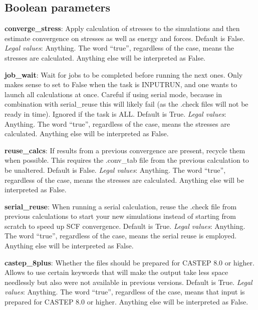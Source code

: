 \documentclass[10pt]{article}
\begin{document}
\subsection{Boolean parameters}

\textbf{converge\_stress}: Apply calculation of stresses to the simulations and 
then estimate convergence on stresses as well as energy and forces. Default is 
False.\newline
\textit{Legal values}: Anything. The word ``true'', regardless of the case, 
means the stresses are calculated. Anything else will be interpreted as 
False.\newline

\textbf{job\_wait}: Wait for jobs to be completed before running the next ones.
Only makes sense to set to False when the task is INPUTRUN, and one wants to 
launch all calculations at once. Careful if using serial mode, because in 
combination with serial\_reuse this will likely fail (as the .check files will
not be ready in time). Ignored if the task is ALL. Default is True.\newline
\textit{Legal values}: Anything. The word ``true'', regardless of the case, 
means the stresses are calculated. Anything else will be interpreted as 
False.\newline

\textbf{reuse\_calcs}: If results from a previous convergence are present, 
recycle them when possible. This requires the .conv\_tab file from the previous 
calculation to be unaltered. Default is False.\newline
\textit{Legal values}: Anything. The word ``true'', regardless of the case, 
means the stresses are calculated. Anything else will be interpreted as 
False.\newline

\textbf{serial\_reuse}: When running a serial calculation, reuse the .check file from previous calculations to start your new simulations instead of starting from scratch to speed up SCF convergence. Default is True.\newline
\textit{Legal values}: Anything. The word ``true'', regardless of the case, 
means the serial reuse is employed. Anything else will be interpreted as 
False.\newline

\textbf{castep\_8plus}: Whether the files should be prepared for CASTEP 8.0 or higher. Allows to use certain keywords that will make the output take less space needlessly but also were not available in previous versions. Default is True.\newline
\textit{Legal values}: Anything. The word ``true'', regardless of the case, 
means that input is prepared for CASTEP 8.0 or higher. Anything else will be interpreted as 
False.\newline
\end{document}
